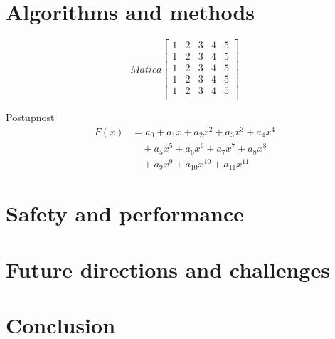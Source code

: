 \documentclass[11pt,oneside,english,a4paper]{article}
\begin{document}
\section{Algorithms and methods} \label{dolezita}



\[Matica
\begin{bmatrix}
1 & 2 & 3 & 4 & 5\\
1 & 2 & 3 & 4 & 5\\
1 & 2 & 3 & 4 & 5\\
1 & 2 & 3 & 4 & 5\\
1 & 2 & 3 & 4 & 5\\
\end{bmatrix}
\]

Postupnost
\begin{align}
    F(x) &= a_0 + a_1 x + a_2 x^2 + a_3 x^3 + a_4 x^4 \nonumber \\
         &\quad + a_5 x^5 + a_6 x^6 + a_7 x^7 + a_8 x^8 \nonumber \\
         &\quad + a_9 x^9 + a_{10} x^{10} + a_{11} x^{11} \nonumber
\end{align}

\section{Safety and performance} \label{dolezitejsia}




\section{Future directions and challenges} \label{dolezitejsia}




\section{Conclusion} \label{zaver} %






\end{document}
